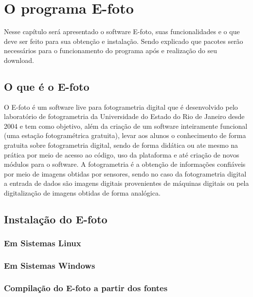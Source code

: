 \chapter{O programa E-foto}

Nesse capítulo será apresentado o software E-foto, suas funcionalidades e o que deve ser feito para sua obtenção e instalação. Sendo explicado que pacotes serão necessários para o funcionamento do programa após e realização do seu download.

\section{O que é o E-foto}

O E-foto é um software live para fotogrametria digital que é desenvolvido pelo laboratório de fotogrametria da Universidade do Estado do Rio de Janeiro desde 2004 e tem como objetivo, além da criação de um software inteiramente funcional (uma estação fotogramétrica gratuita), levar aos alunos o conhecimento de forma gratuita sobre fotogrametria digital, sendo de forma didática ou ate mesmo na prática por meio de acesso ao código, uso da plataforma e até criação de novos módulos para o software. A fotogrametria é a obtenção de informações confiáveis por meio de imagens obtidas por sensores, sendo no caso da fotogrametria digital a entrada de dados são imagens digitais provenientes de máquinas digitais ou pela digitalização de imagens obtidas de forma analógica.

\section{Instalação do E-foto}
\subsection{Em Sistemas Linux}
\subsection{Em Sistemas Windows}

\subsection{Compilação do E-foto a partir dos fontes}
